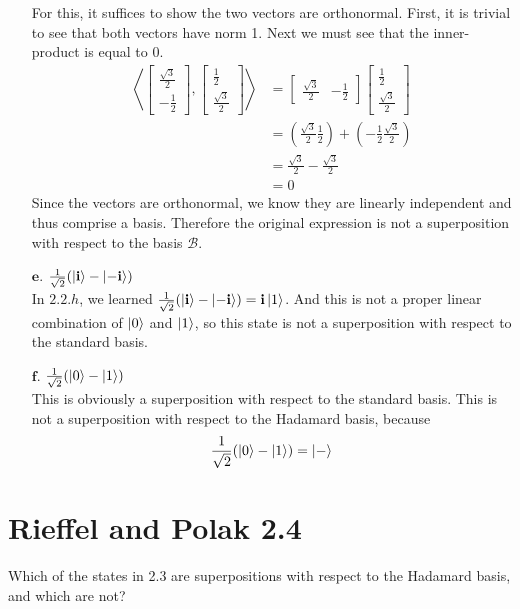 \documentclass[11pt]{article}
\def\bfi{\ensuremath\textbf{i}}
\def\srtt{\ensuremath\frac{1}{\sqrt{2}}}
\begin{document}
\begin{enumerate}
	For this, it suffices to show the two vectors are orthonormal. First, it is trivial to see that both vectors have norm 1. 
	Next we must see that the inner-product is equal to 0. 
	\begin{align*}
		\left\langle\begin{bmatrix} \frac{\sqrt{3}}{2}\\-\frac{1}{2}\end{bmatrix},\begin{bmatrix}\frac{1}{2}\\\frac{\sqrt{3}}{2}\end{bmatrix}\right\rangle 
			&= \begin{bmatrix} \frac{\sqrt{3}}{2} & -\frac{1}{2}\end{bmatrix} \begin{bmatrix}\frac{1}{2}\\\frac{\sqrt{3}}{2}\end{bmatrix} \\
				&= (\frac{\sqrt{3}}{2}\frac{1}{2}) + (-\frac{1}{2}\frac{\sqrt{3}}{2}) \\
				&= \frac{\sqrt{3}}{2} - \frac{\sqrt{3}}{2} \\
				&= 0
	\end{align*}
	Since the vectors are orthonormal, we know they are linearly independent and thus comprise a basis. 
	Therefore the original expression is not a superposition with respect to the basis $\mathcal{B}$.
	
	
	

\item[$\textbf{e.}$] $\srtt(\ket{\bfi} - \ket{-\bfi})$ \\
	In $2.2.h$, we learned $\srtt(\ket{\bfi} - \ket{-\bfi}) = \bfi\ket{1}$.
	And this is not a proper linear combination of $\ket{0}$ and $\ket{1}$,
		so this state is not a superposition with respect to the standard basis.

\item[$\textbf{f.}$] $\srtt(\ket{0} - \ket{1})$ \\
	This is obviously a superposition with respect to the standard basis.
	This is not a superposition with respect to the Hadamard basis, because 
		$$\srtt(\ket{0} - \ket{1}) = \ket{-}$$
\end{enumerate}

\newpage
\section{Rieffel and Polak 2.4}
Which of the states in 2.3 are superpositions with respect to the Hadamard basis,
and which are not?
\end{document}
